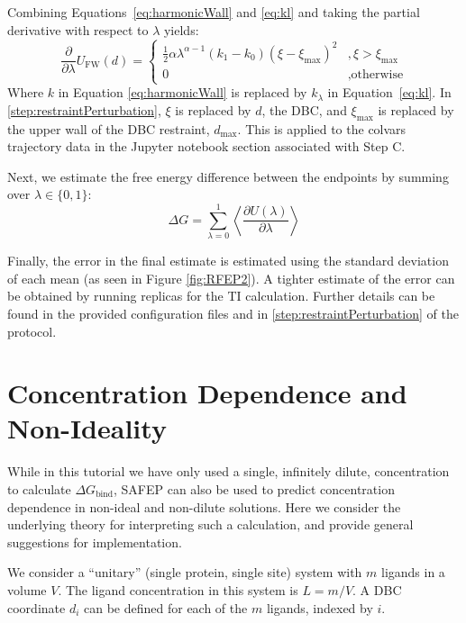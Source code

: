 \documentclass[9pt,tutorial]{Styling/livecoms}
\begin{document}
Combining Equations~\ref{eq:harmonicWall} and \ref{eq:kl} and taking the partial derivative with respect to $\lambda$ yields:
\begin{equation}\label{eq:dUwalldlambda}
    \frac{\partial}{\partial \lambda} U_\mathrm{FW}(d) =\begin{cases}
        \frac{1}{2}\alpha\lambda^{\alpha-1}(k_1 - k_0)(\xi-\xi_\mathrm{max})^2&, \xi>\xi_\mathrm{max}\\
        0 &, \text{otherwise}
    \end{cases} 
\end{equation}
Where $k$ in Equation \ref{eq:harmonicWall} is replaced by $k_\lambda$ in Equation~\ref{eq:kl}.
In \ref{step:restraintPerturbation}, $\xi$ is replaced by $d$, the DBC, and $\xi_\mathrm{max}$ is replaced by the upper wall of the DBC restraint, $d_\mathrm{max}$.
This is applied to the colvars trajectory data in the Jupyter notebook section associated with Step C. 

Next, we estimate the free energy difference between the endpoints by summing over $\lambda\in\{0,1\}$:
\begin{equation} \label{eq:TI}
    \Delta G = \sum_{\lambda=0}^1 \left\langle
    \frac{\partial U(\lambda)}{\partial \lambda}\right\rangle
\end{equation}

Finally, the error in the final estimate is estimated using the standard deviation of each mean (as seen in Figure \ref{fig:RFEP2}). A tighter estimate of the error can be obtained by running replicas for the TI calculation. 
Further details can be found in the provided configuration files and in \ref{step:restraintPerturbation} of the protocol.

\section{Concentration Dependence and Non-Ideality} \label{app:bindingProbability}

While in this tutorial we have only used a single, infinitely dilute, concentration to calculate  $\Delta G_\mathrm{bind}$, SAFEP can also be used to predict concentration dependence in non-ideal and non-dilute solutions.  Here we consider the underlying theory for interpreting such a calculation, and provide general suggestions for implementation.

We consider a ``unitary'' (single protein, single site\cite{Salari2018}) system with $m$ ligands in a volume $V$. The ligand concentration in this system is $L=m/V$. A DBC coordinate $d_i$ can be defined for each of the $m$ ligands, indexed by $i$.  
\end{document}
